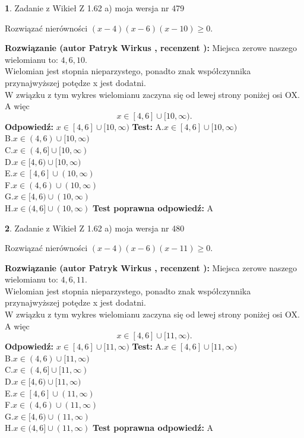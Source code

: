 \documentclass[12pt, a4paper]{article}
\theoremstyle{definition} %
\newtheorem{zad}{}
\newcommand{\zadStart}[1]{\begin{zad}#1\newline}
\newcommand{\zadStop}{\end{zad}}
\newcommand{\rozwStart}[2]{\noindent \textbf{Rozwiązanie (autor #1 , recenzent #2): }\newline}
\newcommand{\rozwStop}{\newline}
\newcommand{\odpStart}{\noindent \textbf{Odpowiedź:}\newline}
\newcommand{\odpStop}{\newline}
\newcommand{\testStart}{\noindent \textbf{Test:}\newline}
\newcommand{\testStop}{\newline}
\newcommand{\kluczStart}{\noindent \textbf{Test poprawna odpowiedź:}\newline}
\newcommand{\kluczStop}{\newline}
\begin{document}
\zadStart{Zadanie z Wikieł Z 1.62 a) moja wersja nr 479}

Rozwiązać nierówności $(x-4)(x-6)(x-10)\ge0$.
\zadStop
\rozwStart{Patryk Wirkus}{}
Miejsca zerowe naszego wielomianu to: $4, 6, 10$.\\
Wielomian jest stopnia nieparzystego, ponadto znak współczynnika przy\linebreak najwyższej potędze x jest dodatni.\\ W związku z tym wykres wielomianu zaczyna się od lewej strony poniżej osi OX. A więc $$x \in [4,6] \cup [10,\infty).$$
\rozwStop
\odpStart
$x \in [4,6] \cup [10,\infty)$
\odpStop
\testStart
A.$x \in [4,6] \cup [10,\infty)$\\
B.$x \in (4,6) \cup [10,\infty)$\\
C.$x \in (4,6] \cup [10,\infty)$\\
D.$x \in [4,6) \cup [10,\infty)$\\
E.$x \in [4,6] \cup (10,\infty)$\\
F.$x \in (4,6) \cup (10,\infty)$\\
G.$x \in [4,6) \cup (10,\infty)$\\
H.$x \in (4,6] \cup (10,\infty)$
\testStop
\kluczStart
A
\kluczStop



\zadStart{Zadanie z Wikieł Z 1.62 a) moja wersja nr 480}

Rozwiązać nierówności $(x-4)(x-6)(x-11)\ge0$.
\zadStop
\rozwStart{Patryk Wirkus}{}
Miejsca zerowe naszego wielomianu to: $4, 6, 11$.\\
Wielomian jest stopnia nieparzystego, ponadto znak współczynnika przy\linebreak najwyższej potędze x jest dodatni.\\ W związku z tym wykres wielomianu zaczyna się od lewej strony poniżej osi OX. A więc $$x \in [4,6] \cup [11,\infty).$$
\rozwStop
\odpStart
$x \in [4,6] \cup [11,\infty)$
\odpStop
\testStart
A.$x \in [4,6] \cup [11,\infty)$\\
B.$x \in (4,6) \cup [11,\infty)$\\
C.$x \in (4,6] \cup [11,\infty)$\\
D.$x \in [4,6) \cup [11,\infty)$\\
E.$x \in [4,6] \cup (11,\infty)$\\
F.$x \in (4,6) \cup (11,\infty)$\\
G.$x \in [4,6) \cup (11,\infty)$\\
H.$x \in (4,6] \cup (11,\infty)$
\testStop
\kluczStart
A
\kluczStop
\end{document}
